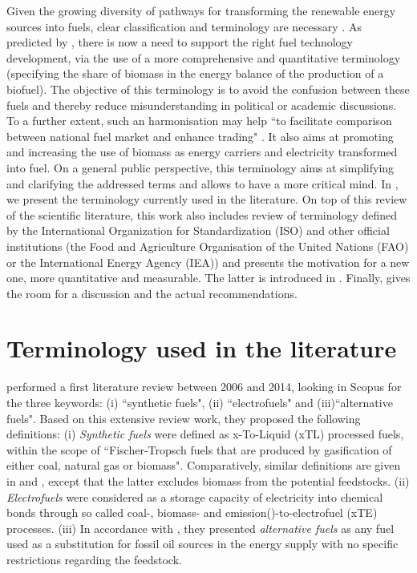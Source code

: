 Given the growing diversity of pathways for transforming the renewable energy sources into fuels, clear classification and terminology are necessary \cite{bailera2017}. As predicted by \citet{ridjan2016}, there is now a need to support the right fuel technology development, via the use of a more comprehensive and quantitative terminology (\eg specifying the share of biomass in the energy balance of the production of a biofuel). The objective of this terminology is to avoid the confusion between these fuels and thereby reduce misunderstanding in political or academic discussions. To a further extent, such an harmonisation may help ``to facilitate comparison between national fuel market and enhance trading" \cite{FAO_biofuel}. It also aims at promoting and increasing the use of biomass as energy carriers and electricity transformed into fuel. On a general public perspective, this terminology aims at simplifying and clarifying the addressed terms and allows to have a more critical mind. In , we present the terminology currently used in the literature. On top of this review of the scientific literature, this work also includes review of terminology defined by the International Organization for Standardization (ISO) and other official institutions (\eg the Food and Agriculture Organisation of the United Nations (FAO) or the International Energy Agency (IEA)) and presents the motivation for a new one, more quantitative and measurable. The latter is introduced in . Finally,  gives the room for a discussion and the actual recommendations.

\section{Terminology used in the literature}
\label{sec:lit_review}
\citet{ridjan2016} performed a first literature review between 2006 and 2014, looking in Scopus for the three keywords: (i) ``synthetic fuels", (ii) ``electrofuels" and (iii)``alternative fuels". Based on this extensive review work, they proposed the following definitions: (i) \textit{Synthetic fuels} were defined as x-To-Liquid (xTL) processed fuels, within the scope of ``Fischer-Tropsch fuels that are produced by gasification of either coal, natural gas or biomass". Comparatively, similar definitions are given in \cite{eia2006} and \cite{iea2007}, except that the latter excludes biomass from the potential feedstocks.
(ii) \textit{Electrofuels} were considered  as a storage capacity of electricity into chemical bonds through so called coal-, biomass- and emission()-to-electrofuel (xTE) processes. 
(iii) In accordance with \cite{european2013proposal}, they presented \textit{alternative fuels} as any fuel used as a substitution for fossil oil sources in the energy supply with no specific restrictions regarding the feedstock. 

